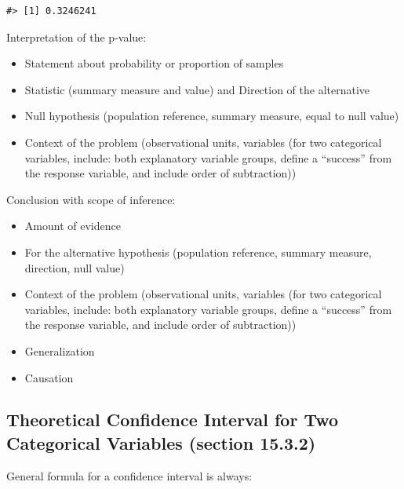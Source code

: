 \documentclass[
]{report}
\begin{document}
\begin{verbatim}
#> [1] 0.3246241
\end{verbatim}

Interpretation of the p-value:

\begin{itemize}
\item
  Statement about probability or proportion of samples
\item
  Statistic (summary measure and value) and Direction of the alternative
\item
  Null hypothesis (population reference, summary measure, equal to null value)
\item
  Context of the problem (observational units, variables (for two categorical variables, include: both explanatory variable groups, define a ``success'' from the response variable, and include order of subtraction))
\end{itemize}

\vspace{0.8in}

Conclusion with scope of inference:

\begin{itemize}
\item
  Amount of evidence
\item
  For the alternative hypothesis (population reference, summary measure, direction, null value)
\item
  Context of the problem (observational units, variables (for two categorical variables, include: both explanatory variable groups, define a ``success'' from the response variable, and include order of subtraction))
\item
  Generalization
\item
  Causation
\end{itemize}

\vspace{0.8in}

\newpage

\subsection*{Theoretical Confidence Interval for Two Categorical Variables (section 15.3.2)}\label{theoretical-confidence-interval-for-two-categorical-variables-section-15.3.2}

General formula for a confidence interval is always:
\end{document}
